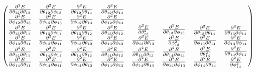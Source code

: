 \documentclass[9pt]{article}
\begin{document}
\begin{equation*}
\begin{pmatrix}
		\begin{matrix} 
			\pdv{E}{\theta_{12}}{\theta_{13}} & \pdv{E}{\theta_{12}}{\phi_{13}} \\
			\pdv{E}{\phi_{12}}{\theta_{13}} & \pdv{E}{\phi_{12}}{\phi_{13}} 
		\end{matrix}&
		\begin{matrix} 
			\pdv{E}{\theta_{12}}{\theta_{14}} & \pdv{E}{\theta_{12}}{\phi_{14}} \\
			\pdv{E}{\phi_{12}}{\theta_{14}} & \pdv{E}{\phi_{12}}{\phi_{14}} 
		\end{matrix}\\
		\begin{matrix} 
			\pdv{E}{\theta_{13}}{\theta_{11}} & \pdv{E}{\theta_{13}}{\phi_{11}} \\
			\pdv{E}{\phi_{13}}{\theta_{11}} & \pdv{E}{\phi_{13}}{\phi_{11}} 
		\end{matrix} & 
		\begin{matrix} 
			\pdv{E}{\theta_{13}}{\theta_{12}} & \pdv{E}{\theta_{13}}{\phi_{12}} \\
			\pdv{E}{\phi_{13}}{\theta_{12}} & \pdv{E}{\phi_{13}}{\phi_{12}} 
		\end{matrix}&
		\begin{matrix} 
			\pdv[2]{E}{\theta_{13}} & \pdv{E}{\theta_{13}}{\phi_{13}} \\
			\pdv{E}{\phi_{13}}{\theta_{13}} & \pdv[2]{E}{\phi_{13}} 
		\end{matrix}&
		\begin{matrix} 
			\pdv{E}{\theta_{13}}{\theta_{14}} & \pdv{E}{\theta_{13}}{\phi_{14}} \\
			\pdv{E}{\phi_{13}}{\theta_{14}} & \pdv{E}{\phi_{13}}{\phi_{14}} 
		\end{matrix}\\
		\begin{matrix} 
			\pdv{E}{\theta_{14}}{\theta_{11}} & \pdv{E}{\theta_{14}}{\phi_{11}} \\
			\pdv{E}{\phi_{14}}{\theta_{11}} & \pdv{E}{\phi_{14}}{\phi_{11}} 
		\end{matrix} & 
		\begin{matrix} 
			\pdv{E}{\theta_{14}}{\theta_{12}} & \pdv{E}{\theta_{14}}{\phi_{12}} \\
			\pdv{E}{\phi_{14}}{\theta_{12}} & \pdv{E}{\phi_{14}}{\phi_{12}} 
		\end{matrix}&
		\begin{matrix} 
			\pdv{E}{\theta_{14}}{\theta_{13}} & \pdv{E}{\theta_{14}}{\phi_{13}} \\
			\pdv{E}{\phi_{14}}{\theta_{13}} & \pdv{E}{\phi_{14}}{\phi_{13}}
		\end{matrix}&
		\begin{matrix} 
			\pdv[2]{E}{\theta_{14}} & \pdv{E}{\theta_{14}}{\phi_{14}} \\
			\pdv{E}{\phi_{14}}{\theta_{14}} & \pdv[2]{E}{\phi_{14}} 
		\end{matrix}
	\end{pmatrix}
\end{equation*}
\end{document}

